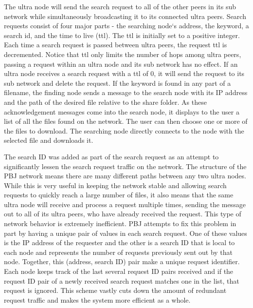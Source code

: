 \documentclass{acm_proc_article-sp}
\begin{document}
 The ultra node will send the search request to all of the other peers in its sub network while simultaneously broadcasting it to its connected ultra peers.  Search requests consist of four major parts - the searching node`s address, the keyword, a search id, and the time to live (ttl).  The ttl is initially set to a positive integer.  Each time a search request is passed between ultra peers, the request ttl is decremented.  Notice that ttl only limits the number of hops among ultra peers, passing a request within an ultra node and its sub network has no effect.  If an ultra node receives a search request with a ttl of 0, it will send the request to its sub network and delete the request.  If the keyword is found in any part of a filename, the finding node sends a message to the search node with its IP address and the path of the desired file relative to the share folder.  As these acknowledgement messages come into the search node, it displays to the user a list of all the files found on the network.  The user can then choose one or more of the files to download.  The searching node directly connects to the node with the selected file and downloads it. 
 
 The search ID was added as part of the search request as an attempt to significantly lessen the search request traffic on the network.  The structure of the PBJ network means there are many different paths between any two ultra nodes.  While this is very useful in keeping the network stable and allowing search requests to quickly reach a large number of files, it also means that the same ultra node will receive and process a request multiple times, sending the message out to all of its ultra peers, who have already received the request.  This type of network behavior is extremely inefficient.  PBJ attempts to fix this problem in part by having a unique pair of values in each search request.  One of these values is the IP address of the requester and the other is a search ID that is local to each node and represents the number of requests previously sent out by that node. Together, this (address, search ID) pair make a unique request identifier. Each node keeps track of the last several request ID pairs received and if the request ID pair of a newly received search request matches one in the list, that request is ignored.  This scheme vastly cuts down the amount of redundant request traffic and makes the system more efficient as a whole.
     
\end{document}

